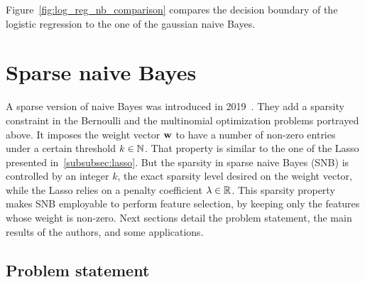 Figure~\ref{fig:log_reg_nb_comparison} compares the decision boundary of the logistic regression to the one
of the gaussian naive Bayes.


\section{Sparse naive Bayes}\label{sec:snb}

A sparse version of naive Bayes was introduced in 2019~\cite{sparse_naive_bayes}.
They add a sparsity constraint in the Bernoulli and the multinomial optimization problems portrayed above.
It imposes the weight vector $\mathbf{w}$ to have a number of non-zero entries under a certain threshold $k \in \mathbb{N}$.
That property is similar to the one of the Lasso presented in~\ref{subsubsec:lasso}.
But the sparsity in sparse naive Bayes (SNB) is controlled by an integer $k$,
the exact sparsity level desired on the weight vector,
while the Lasso relies on a penalty coefficient $\lambda \in \mathbb{R}$.
This sparsity property makes SNB employable to perform feature selection,
by keeping only the features whose weight is non-zero.
Next sections detail the problem statement, the main results of the authors,
and some applications.

\subsection{Problem statement}\label{subsec:snb_ps}


